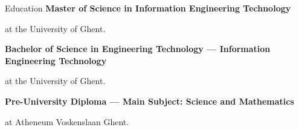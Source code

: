 \begin{rubric}{Education}
    \entry*[Expected 2026]%
        \textbf{Master of Science in Information Engineering Technology}\par at the University of Ghent.

    \entry*[Expected 2025]%
        \textbf{Bachelor of Science in Engineering Technology — Information Engineering Technology}\par at the University of Ghent.\par

    \entry*[2014 -- 2020]%
        \textbf{Pre-University Diploma — Main Subject: Science and Mathematics}\par at Atheneum Voskenslaan Ghent. \par
\end{rubric}
